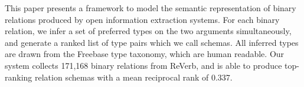 This paper presents a framework to model the semantic representation of binary relations produced by open information extraction systems. For each binary relation, we infer a set of preferred types on the two arguments simultaneously, and generate a ranked list of type pairs which we call schemas. All inferred types are drawn from the Freebase type taxonomy, which are human readable. Our system collects 171,168 binary relations from ReVerb, and is able to produce top-ranking relation schemas with a mean reciprocal rank of 0.337.
